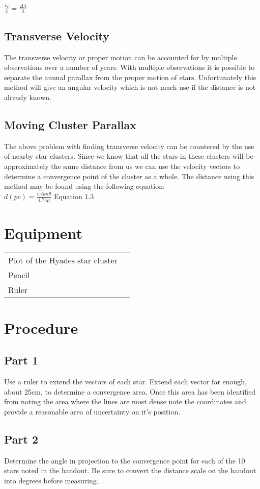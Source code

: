 \documentclass{article}
\begin{document}
$\frac{v_r}{c}=\frac{\Delta\lambda}{\lambda}$
\subsection{Transverse Velocity}
The transverse velocity or proper motion can be accounted for by multiple observations over a number of years. With multiple observations it is possible to separate the annual parallax from the proper motion of stars. Unfortunately this method will give an angular velocity which is not much use if the distance is not already known. 
\subsection{Moving Cluster Parallax}
The above problem with finding transverse velocity can be countered by the use of nearby star clusters. Since we know that all the stars in these clusters will be approximately the same distance from us we can use the velocity vectors to determine a convergence point of the cluster as a whole. The distance using this method may be found using the following equation:\\

$d(pc)=\frac{v_r tan\theta}{4.74\mu} $ Equation 1.3
\section{Equipment}
\begin{tabular}{ll}
Plot of the Hyades star cluster\\
Pencil\\
Ruler\\
\end{tabular}

\section{Procedure}
\subsection{Part 1}
Use a ruler to extend the vectors of each star. Extend each vector far enough, about 25cm, to determine a convergence area. Once this area has been identified from noting the area where the lines are most dense note the coordinates and provide a reasonable area of uncertainty on it's position. 
\subsection{Part 2}
Determine the angle in projection to the convergence point for each of the 10 stars noted in the handout. Be sure to convert the distance scale on the handout into degrees before measuring.
\end{document}
